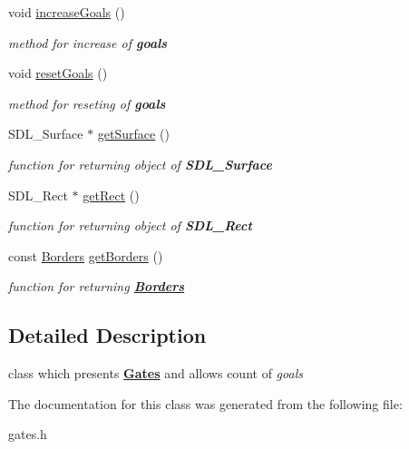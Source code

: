 \begin{DoxyCompactItemize}
\mbox{\label{class_gates_a00690f7b47cb7cccc4e0960d8c67b5b3}} 
void \mbox{\hyperlink{class_gates_a00690f7b47cb7cccc4e0960d8c67b5b3}{increase\+Goals}} ()
\begin{DoxyCompactList}\small\item\em {\itshape method} for increase of {\bfseries{goals}} \end{DoxyCompactList}\item 
\mbox{\label{class_gates_ab9286e210f9cdc99216e461ef41bc906}} 
void \mbox{\hyperlink{class_gates_ab9286e210f9cdc99216e461ef41bc906}{reset\+Goals}} ()
\begin{DoxyCompactList}\small\item\em {\itshape method} for reseting of {\bfseries{goals}} \end{DoxyCompactList}\item 
\mbox{\label{class_gates_a0cc661b6807b5bb4046308e5defb1ecc}} 
S\+D\+L\+\_\+\+Surface $\ast$ \mbox{\hyperlink{class_gates_a0cc661b6807b5bb4046308e5defb1ecc}{get\+Surface}} ()
\begin{DoxyCompactList}\small\item\em {\itshape function} for returning {\itshape object} of {\bfseries{S\+D\+L\+\_\+\+Surface}} \end{DoxyCompactList}\item 
\mbox{\label{class_gates_a67114de506623278c24dfb441c11d2e0}} 
S\+D\+L\+\_\+\+Rect $\ast$ \mbox{\hyperlink{class_gates_a67114de506623278c24dfb441c11d2e0}{get\+Rect}} ()
\begin{DoxyCompactList}\small\item\em {\itshape function} for returning {\itshape object} of {\bfseries{S\+D\+L\+\_\+\+Rect}} \end{DoxyCompactList}\item 
\mbox{\label{class_gates_a0602ef6d3d51a2791f558549d6feea65}} 
const \mbox{\hyperlink{class_borders}{Borders}} \mbox{\hyperlink{class_gates_a0602ef6d3d51a2791f558549d6feea65}{get\+Borders}} ()
\begin{DoxyCompactList}\small\item\em {\itshape function} for returning {\bfseries{\mbox{\hyperlink{class_borders}{Borders}}}} \end{DoxyCompactList}\end{DoxyCompactItemize}


\subsection{Detailed Description}
class which presents {\bfseries{\mbox{\hyperlink{class_gates}{Gates}}}} and allows count of {\itshape goals} 

The documentation for this class was generated from the following file\+:\begin{DoxyCompactItemize}
\item 
gates.\+h\end{DoxyCompactItemize}
